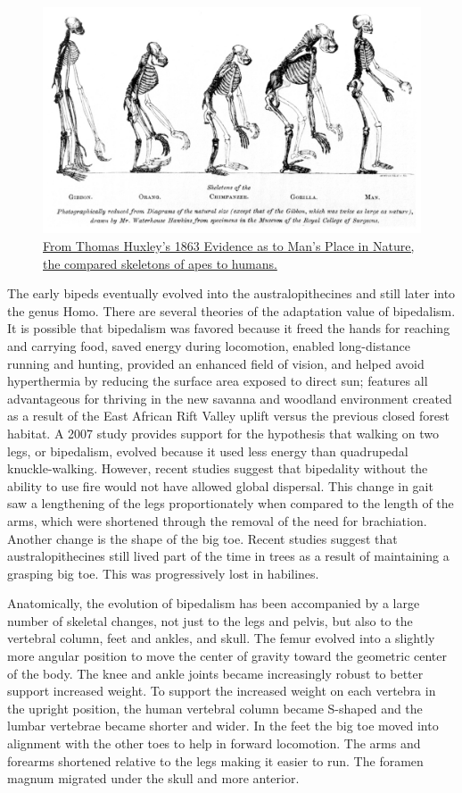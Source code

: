 \begin{figure}

{\centering \includegraphics[width=0.7\linewidth]{./figures/animals/Huxley_-_Mans_Place_in_Nature} 

}

\caption{\href{https://commons.wikimedia.org/wiki/File:Huxley_-_Mans_Place_in_Nature.jpg}{From Thomas Huxley's 1863 Evidence as to Man's Place in Nature, the compared skeletons of apes to humans.}}\label{fig:skeletoncomparison}
\end{figure}

The early bipeds eventually evolved into the australopithecines and still later into the genus Homo. There are several theories of the adaptation value of bipedalism. It is possible that bipedalism was favored because it freed the hands for reaching and carrying food, saved energy during locomotion, enabled long-distance running and hunting, provided an enhanced field of vision, and helped avoid hyperthermia by reducing the surface area exposed to direct sun; features all advantageous for thriving in the new savanna and woodland environment created as a result of the East African Rift Valley uplift versus the previous closed forest habitat. A 2007 study provides support for the hypothesis that walking on two legs, or bipedalism, evolved because it used less energy than quadrupedal knuckle-walking. However, recent studies suggest that bipedality without the ability to use fire would not have allowed global dispersal. This change in gait saw a lengthening of the legs proportionately when compared to the length of the arms, which were shortened through the removal of the need for brachiation. Another change is the shape of the big toe. Recent studies suggest that australopithecines still lived part of the time in trees as a result of maintaining a grasping big toe. This was progressively lost in habilines.

Anatomically, the evolution of bipedalism has been accompanied by a large number of skeletal changes, not just to the legs and pelvis, but also to the vertebral column, feet and ankles, and skull. The femur evolved into a slightly more angular position to move the center of gravity toward the geometric center of the body. The knee and ankle joints became increasingly robust to better support increased weight. To support the increased weight on each vertebra in the upright position, the human vertebral column became S-shaped and the lumbar vertebrae became shorter and wider. In the feet the big toe moved into alignment with the other toes to help in forward locomotion. The arms and forearms shortened relative to the legs making it easier to run. The foramen magnum migrated under the skull and more anterior.

